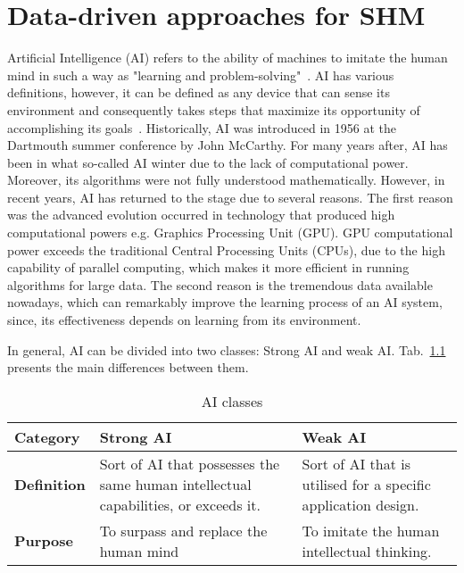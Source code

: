 
\chapter[Data-driven for SHM]{Data-driven approaches for SHM}
\label{ch3}

Artificial Intelligence (AI) refers to the ability of machines to imitate the human mind in such a way as "learning and problem-solving"~\cite{Russell2010}.
AI has various definitions, however, it can be defined as any device that can sense its environment and consequently takes steps that maximize its opportunity of accomplishing its goals~\cite{Russell2010}.
Historically, AI was introduced in 1956 at the Dartmouth summer conference by John McCarthy.
For many years after, AI has been in what so-called AI winter due to the lack of  computational power.
Moreover, its algorithms were not fully understood mathematically.
However, in recent years, AI has returned to the stage due to several reasons. The first reason was the advanced evolution occurred in technology that produced high computational powers e.g. Graphics Processing Unit (GPU). 
GPU computational power exceeds the traditional Central Processing Units (CPUs), due to the high capability of parallel computing, which makes it more efficient in running algorithms for large data.
The second reason is the tremendous data available nowadays, which can remarkably improve the learning process of an AI system, since, its effectiveness depends on learning from its environment. 

In general, AI can be divided into two classes: Strong AI and weak AI. Tab.~\ref{tab:Strong_Weak_AI} presents the main differences between them.
\begin{table}[h]
	\renewcommand{\arraystretch}{1.1}
	\centering
	\caption{AI classes}
	\scriptsize
	\begin{tabular}{p{2cm}p{4cm}p{4cm}} 
		\toprule
		\textbf{Category} & \textbf{Strong AI} & \textbf{Weak AI} \\ \midrule
		\textbf{Definition} & Sort of AI that possesses the same human intellectual capabilities, or exceeds it. & Sort of AI that is utilised for a specific application design. \\ \midrule
		
		\textbf{Purpose} &To surpass and replace the human mind  &  To imitate the human intellectual thinking. \\  
		\bottomrule
	\end{tabular}
	\label{tab:Strong_Weak_AI}
\end{table}
